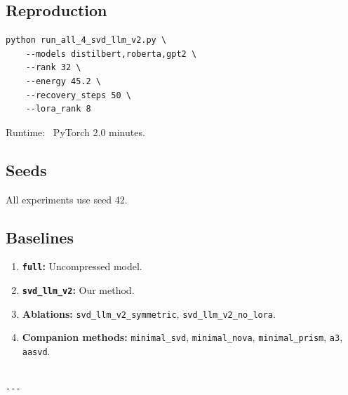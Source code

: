 \subsection{Reproduction}

\begin{lstlisting}
python run_all_4_svd_llm_v2.py \
    --models distilbert,roberta,gpt2 \
    --rank 32 \
    --energy 45.2 \
    --recovery_steps 50 \
    --lora_rank 8
\end{lstlisting}

Runtime: ~PyTorch 2.0 minutes.

\subsection{Seeds}

All experiments use seed 42.

\subsection{Baselines}

\begin{enumerate}
\item \textbf{\texttt{full}:} Uncompressed model.
\item \textbf{\texttt{svd\_llm\_v2}:} Our method.
\item \textbf{Ablations:} \texttt{svd\_llm\_v2\_symmetric}, \texttt{svd\_llm\_v2\_no\_lora}.
\item \textbf{Companion methods:} \texttt{minimal\_svd}, \texttt{minimal\_nova}, \texttt{minimal\_prism}, \texttt{a3}, \texttt{aasvd}.
\end{enumerate}
\begin{lstlisting}

---
\end{lstlisting}